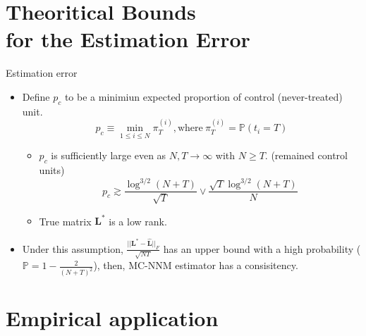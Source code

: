 \documentclass[xcolor=svgnames,aspectratio=169]{beamer}
\begin{document}
\section{Theoritical Bounds \\ for the Estimation Error}

\begin{frame}{Estimation error}
    \begin{itemize}
        \item Define $p_c$ to be a minimiun expected proportion of control (never-treated) unit.
        \[
        p_c\equiv \min_{1\leq i\leq N}\pi_T^{(i)}, \text{where} \ \pi_T^{(i)}=\mathbb{P}(t_i=T)
        \]
        \begin{tcolorbox}[colframe=lightgray,title=Assumption 2]
        \begin{itemize}
            \item $p_c$ is sufficiently large even as $N,T \to \infty$ with $N\geq T$. (remained control units)
            \[
            p_c \gtrsim \frac{\log^{3/2}(N+T)}{\sqrt{T}} \vee \frac{\sqrt{T}\log^{3/2}(N+T)}{N}
            \]
            \item True matrix $\mathbf{{L}}^*$ is a low rank.
        \end{itemize}
        \end{tcolorbox}
        \item Under this assumption, $\frac{||\mathbf{{L}^*-\mathbf{\hat{L}}}||_F}{\sqrt{NT}}$ has an upper bound with a high probability ($\mathbb{P}=1-\frac{2}{(N+T)^2}$), then, MC-NNM estimator has a \alert{consisitency}.
    \end{itemize}
\end{frame}

\section{Empirical application}
\end{document}

